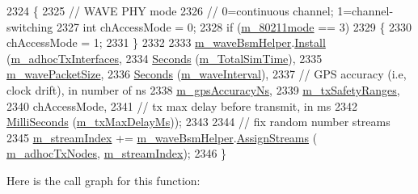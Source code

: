 \begin{DoxyCode}
2324 \{
2325   \textcolor{comment}{// WAVE PHY mode}
2326   \textcolor{comment}{// 0=continuous channel; 1=channel-switching}
2327   \textcolor{keywordtype}{int} chAccessMode = 0;
2328   \textcolor{keywordflow}{if} (\hyperlink{classVanetRoutingExperiment_aae21b34a7fb447a2d7d5bcbcbe8e5fae}{m\_80211mode} == 3)
2329     \{
2330       chAccessMode = 1;
2331     \}
2332 
2333   \hyperlink{classVanetRoutingExperiment_a690b550804fc4c9bcfab6b8ae40e4728}{m\_waveBsmHelper}.\hyperlink{classns3_1_1WaveBsmHelper_a1f30ea7ae1ed3d1f10760b876b69b349}{Install} (\hyperlink{classVanetRoutingExperiment_ae87cd0d7f20b0cd7dda83d187938ffd0}{m\_adhocTxInterfaces},
2334                            \hyperlink{group__timecivil_ga33c34b816f8ff6628e33d5c8e9713b9e}{Seconds} (\hyperlink{classVanetRoutingExperiment_acae630bc30645931dcb68283b0217b1b}{m\_TotalSimTime}),
2335                            \hyperlink{classVanetRoutingExperiment_a9f07935713904851763620de8d879134}{m\_wavePacketSize},
2336                            \hyperlink{group__timecivil_ga33c34b816f8ff6628e33d5c8e9713b9e}{Seconds} (\hyperlink{classVanetRoutingExperiment_a273a08aab5e5e9c40b9ce6d51577b640}{m\_waveInterval}),
2337                            \textcolor{comment}{// GPS accuracy (i.e, clock drift), in number of ns}
2338                            \hyperlink{classVanetRoutingExperiment_a93d058dcc4a02c67de923ab6a1d8bf85}{m\_gpsAccuracyNs},
2339                            \hyperlink{classVanetRoutingExperiment_a6cd05046b2e71e266ee72b0d31f8dcc9}{m\_txSafetyRanges},
2340                            chAccessMode,
2341                            \textcolor{comment}{// tx max delay before transmit, in ms}
2342                            \hyperlink{group__timecivil_gaf26127cf4571146b83a92ee18679c7a9}{MilliSeconds} (\hyperlink{classVanetRoutingExperiment_a9190dcd0fea18c790a67ee058416c8dd}{m\_txMaxDelayMs}));
2343 
2344   \textcolor{comment}{// fix random number streams}
2345   \hyperlink{classVanetRoutingExperiment_a3c86fdbcf9e422486ba1d75020a9c90e}{m\_streamIndex} += \hyperlink{classVanetRoutingExperiment_a690b550804fc4c9bcfab6b8ae40e4728}{m\_waveBsmHelper}.\hyperlink{classns3_1_1WaveBsmHelper_ae70eefd2d78ae539e65ea27468a525d2}{AssignStreams} (
      \hyperlink{classVanetRoutingExperiment_aaea34adc85cd667ea5d3371c3fa1e3dc}{m\_adhocTxNodes}, \hyperlink{classVanetRoutingExperiment_a3c86fdbcf9e422486ba1d75020a9c90e}{m\_streamIndex});
2346 \}
\end{DoxyCode}


Here is the call graph for this function\+:




